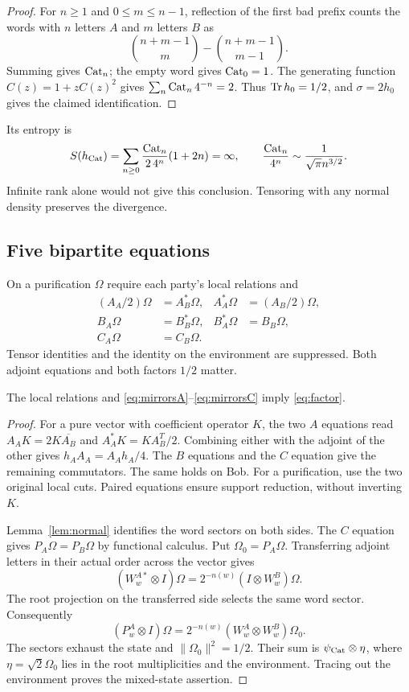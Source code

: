 \begin{proof}
For $n\geq1$ and $0\leq m\leq n-1$, reflection of the first bad prefix counts the words with $n$ letters $A$ and $m$ letters $B$ as
\[
 \binom{n+m-1}{m}-\binom{n+m-1}{m-1}.
\]
Summing gives $\operatorname{Cat}_n$; the empty word gives $\operatorname{Cat}_0=1$. The generating function $C(z)=1+zC(z)^2$ gives $\sum_n\operatorname{Cat}_n4^{-n}=2$. Thus $\operatorname{Tr} h_0=1/2$, and $\sigma=2h_0$ gives the claimed identification.
\end{proof}

Its entropy is
\begin{equation}\label{eq:infiniteentropy}
 S(h_{\mathrm{Cat}})=\sum_{n\geq0}\frac{\operatorname{Cat}_n}{2\,4^n}(1+2n)=\infty,
 \qquad \frac{\operatorname{Cat}_n}{4^n}\sim\frac1{\sqrt\pi n^{3/2}}.
\end{equation}
Infinite rank alone would not give this conclusion. Tensoring with any normal density preserves the divergence.

\subsection{Five bipartite equations}
On a purification $\Omega$ require each party's local relations and
\begin{align}
 (A_A/2)\Omega&=A_B^*\Omega,& A_A^*\Omega&=(A_B/2)\Omega,\label{eq:mirrorsA}\\
 B_A\Omega&=B_B^*\Omega,&B_A^*\Omega&=B_B\Omega,\label{eq:mirrorsB}\\
 C_A\Omega&=C_B\Omega.&&\label{eq:mirrorsC}
\end{align}
Tensor identities and the identity on the environment are suppressed. Both adjoint equations and both factors $1/2$ matter.

\begin{lemma}\label{lem:pure}
The local relations and \eqref{eq:mirrorsA}--\eqref{eq:mirrorsC} imply \eqref{eq:factor}.
\end{lemma}
\begin{proof}
For a pure vector with coefficient operator $K$, the two $A$ equations read
$A_AK=2K\overline{A_B}$ and $A_A^*K=KA_B^T/2$. Combining either with the adjoint of the other gives $h_AA_A=A_Ah_A/4$. The $B$ equations and the $C$ equation give the remaining commutators. The same holds on Bob. For a purification, use the two original local cuts. Paired equations ensure support reduction, without inverting $K$.

Lemma~\ref{lem:normal} identifies the word sectors on both sides. The $C$ equation gives $P_A\Omega=P_B\Omega$ by functional calculus. Put $\Omega_0=P_A\Omega$. Transferring adjoint letters in their actual order across the vector gives
\[
 (W_w^{A*}\otimes I)\Omega
 =2^{-n(w)}(I\otimes W_w^B)\Omega.
\]
The root projection on the transferred side selects the same word sector. Consequently
\[
 (P_w^A\otimes I)\Omega
 =2^{-n(w)}(W_w^A\otimes W_w^B)\Omega_0.
\]
The sectors exhaust the state and $\|\Omega_0\|^2=1/2$. Their sum is $\psi_{\mathrm{Cat}}\otimes\eta$, where $\eta=\sqrt2\Omega_0$ lies in the root multiplicities and the environment. Tracing out the environment proves the mixed-state assertion.
\end{proof}
